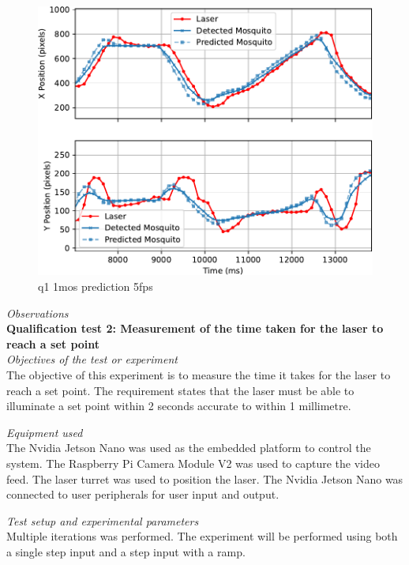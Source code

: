 \begin{figure}[h]
  \centering
  \includegraphics[width=\textwidth]{figures/results/q1_1mos_prediction_5fps.pdf}
  \caption{q1 1mos prediction 5fps}
  \label{fig:q1_1mos_prediction_5fps}
\end{figure}

\textit{Observations}\\

\textbf{Qualification test 2: Measurement of the time taken for the laser to reach a set point}\\

\textit{Objectives of the test or experiment}\\
The objective of this experiment is to measure the time it takes for the laser to reach a set point. The requirement states that the laser must be able to illuminate a set point within 2 seconds accurate to within 1 millimetre.

\textit{Equipment used}\\
The Nvidia Jetson Nano was used as the embedded platform to control the system. The Raspberry Pi Camera Module V2 was used to capture the video feed. The laser turret was used to position the laser. The Nvidia Jetson Nano was connected to user peripherals for user input and output.

\textit{Test setup and experimental parameters}\\
Multiple iterations was performed. The experiment will be performed using both a single step input and a step input with a ramp.

